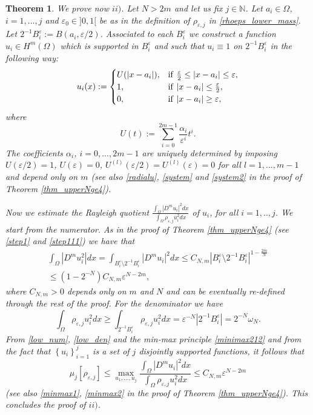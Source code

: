 \documentclass[11pt,a4paper]{amsart}
\numberwithin{equation}{section}
\newtheorem{thm}[equation]{Theorem}
\begin{document}
\begin{thm}
We prove now $ii)$. Let $N>2m$ and let us fix $j\in\mathbb N$. Let $a_i\in\Omega$, $i=1,...,j$ and $\varepsilon_0\in]0,1[$ be as in the definition of $\rho_{\varepsilon,j}$ in \eqref{rhoeps_lower_mass}. Let $2^{-1}B_i^{\varepsilon}:=B(a_i,\varepsilon/2)$. Associated to each $B_i^{\varepsilon}$ we construct a function $u_i\in H^m(\Omega)$ which is supported in $B_i^{\varepsilon}$ and such that $u_i\equiv 1$ on $2^{-1}B_i^{\varepsilon}$ in the following way:
\begin{equation*}
u_i(x):=
\begin{cases}
U(|x-a_i|), & {\rm if\ } \frac{\varepsilon}{2}\leq |x-a_i| \leq \varepsilon,\\
1, & {\rm if\ } |x-a_i|\leq\frac{\varepsilon}{2},\\
0, & {\rm if\ } |x-a_i|\geq\varepsilon,
\end{cases}
\end{equation*}
where
\begin{equation*}%
U(t):=\sum_{i=0}^{2m-1}\frac{\alpha_i}{\varepsilon^i} t^i.
\end{equation*}
The coefficients $\alpha_i$, $i=0,...,2m-1$  are uniquely determined by imposing $U(\varepsilon/2)=1$, $U(\varepsilon)=0$, $U^{(l)}(\varepsilon/2)=U^{(l)}(\varepsilon)=0$ for all $l=1,...,m-1$ and depend only on $m$ (see also \eqref{radialu}, \eqref{system} and \eqref{system2} in the proof of Theorem \ref{thm_upperNge4}).

Now we estimate the Rayleigh quotient $\frac{\int_{\Omega}|D^mu_i|^2dx}{\int_{\Omega}\rho_{\varepsilon,j}u_i^2dx}$ of $u_i$, for all $i=1,..,j$. We start from the numerator. As in the proof of Theorem \ref{thm_upperNge4} (see \eqref{step1} and \eqref{step111}) we have that
\begin{multline}\label{low_num}
\int_{\Omega}|D^m u_i^2|dx=\int_{B_i^{\varepsilon}\setminus 2^{-1}B_i^{\varepsilon}}|D^m u_i|^2dx\leq C_{N,m}|B_i^{\varepsilon}\setminus 2^{-1}B_i^{\varepsilon}|^{1-\frac{2m}{N}}\\
\leq (1-2^{-N})C_{N,m}\varepsilon^{N-2m},
\end{multline}
where $C_{N,m}>0$ depends only on $m$ and $N$ and can be eventually re-defined through the rest of the proof. For the denominator we have
\begin{equation}\label{low_den}
\int_{\Omega}\rho_{\varepsilon,j}u_i^2dx\geq\int_{2^{-1}B_i^{\varepsilon}}\rho_{\varepsilon,j}u_i^2dx=\varepsilon^{-N}|2^{-1}B_i^{\varepsilon}|=2^{-N}\omega_N.
\end{equation}
From \eqref{low_num}, \eqref{low_den} and the min-max principle \eqref{minimax212} and from the fact that $\left\{u_i\right\}_{i=1}^j$ is a set of $j$ disjointly supported functions, it follows that
$$
\mu_j[\rho_{\varepsilon,j}]\leq\max_{u_1,...,u_j}\frac{\int_{\Omega}|D^mu_i|^2dx}{\int_{\Omega}\rho_{\varepsilon,j}u_i^2dx}\leq C_{N,m} \varepsilon^{N-2m}
$$   
(see also \eqref{minmax1}, \eqref{minmax2} in the proof of Theorem \ref{thm_upperNge4}). This concludes the proof of $ii)$.


\end{thm}
\end{document}
